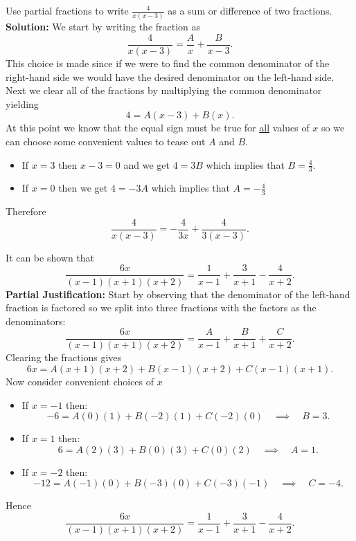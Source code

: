 \begin{example}
    Use partial fractions to write $\frac{4}{x(x-3)}$ as a sum or difference of two
    fractions. \\
    {\bf Solution:} We start by writing the fraction as
    \[ \frac{4}{x(x-3)} = \frac{A}{x} + \frac{B}{x-3}. \]
    This choice is made since if we were to find the common denominator of the right-hand
    side we would have the desired denominator on the left-hand side.  Next we clear all
    of the fractions by multiplying the common denominator yielding
    \[ 4 = A(x-3) + B(x). \]
    At this point we know that the equal sign must be true for \underline{all} values of
    $x$ so we can choose some convenient values to tease out $A$ and $B$.
    \begin{itemize}
        \item If $x = 3$ then $x-3=0$ and we get $4 = 3B$ which implies that $B =
            \frac{4}{3}$.
        \item If $x =0$ then we get $4 = -3A$ which implies that $A =
            -\frac{4}{3}$
    \end{itemize}
    Therefore
    \[ \frac{4}{x(x-3)} = -\frac{4}{3x} + \frac{4}{3(x-3)}. \]
\end{example}

\begin{example}
    It can be shown that 
    \[ \frac{6x}{(x-1)(x+1)(x+2)} = \frac{1}{x-1} + \frac{3}{x+1} - \frac{4}{x+2}. \]
    {\bf Partial Justification:} Start by observing that the denominator of the left-hand
    fraction is factored so we split into three fractions with the factors as the
    denominators:
    \[ \frac{6x}{(x-1)(x+1)(x+2)} = \frac{A}{x-1} + \frac{B}{x+1} + \frac{C}{x+2}. \]
    Clearing the fractions gives
    \[ 6x = A(x+1)(x+2) + B(x-1)(x+2) + C(x-1)(x+1). \]
    Now consider convenient choices of $x$
    \begin{itemize}
        \item If $x=-1$ then:
            \[ -6 = A(0)(1) + B(-2)(1) + C(-2)(0) \quad \implies \quad B = 3. \]
        \item If $x=1$ then:
            \[ 6 = A(2)(3) + B(0)(3) + C(0)(2) \quad \implies \quad A = 1. \]
        \item If $x=-2$ then:
            \[ -12 = A(-1)(0) + B(-3)(0) + C(-3)(-1) \quad \implies \quad C = -4. \]
    \end{itemize}
    Hence
    \[ \frac{6x}{(x-1)(x+1)(x+2)} = \frac{1}{x-1} + \frac{3}{x+1} - \frac{4}{x+2}. \]
\end{example}

